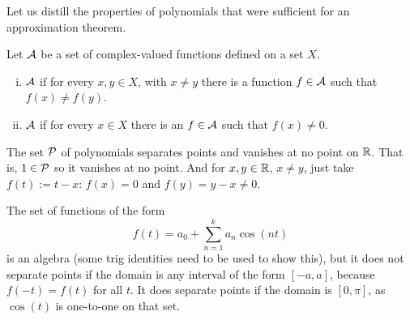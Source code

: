 %



Let us distill the properties of polynomials that were sufficient
for an approximation theorem.

\begin{defn}
Let ${\mathcal{A}}$ be a set of complex-valued functions defined on a set $X$.
\begin{enumerate}[(i)]
\item ${\mathcal{A}}$ \emph{}
if for every $x,y \in X$, with $x \not= y$ there is a function $f \in {\mathcal{A}}$ such that
$f(x) \not= f(y)$.
\item 
${\mathcal{A}}$ \emph{} if for every $x \in X$
there is an $f \in {\mathcal{A}}$ such that $f(x) \not= 0$.
\end{enumerate}
\end{defn}

\begin{example}
The set ${\mathcal{P}}$ of polynomials separates points and vanishes at no point
on ${\mathbb{R}}$.  That is, $1 \in {\mathcal{P}}$ so it vanishes at no point.  And for $x,y \in
{\mathbb{R}}$, $x\not= y$, just take $f(t) := t-x$: $f(x) = 0$ and $f(y) = y-x
\not= 0$.
\end{example}

\begin{example}
The set of functions of the form
\begin{equation*}
f(t) = a_0 + \sum_{n=1}^k a_n \cos(nt)
\end{equation*}
is an algebra (some trig identities need to be used to show this), but
it
does not separate points if the domain is any interval of the form
$[-a,a]$, because $f(-t) = f(t)$ for all $t$.
It does separate points if the domain is $[0,\pi]$, as $\cos(t)$
is one-to-one on that set.
\end{example}

